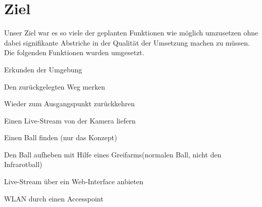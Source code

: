 \chapter{Ziel}
Unser Ziel war es so viele der geplanten Funktionen wie möglich umzusetzen ohne dabei signifikante Abstriche in der Qualität der Umsetzung machen zu müssen. Die folgenden Funktionen wurden umgesetzt.

\begin{capitemize}
	\item Erkunden der Umgebung
	\item Den zurückgelegten Weg merken
	\item Wieder zum Ausgangspunkt zurückkehren
	\item Einen Live-Stream von der Kamera liefern
	\item Einen Ball finden (nur das Konzept)
	\item Den Ball aufheben mit Hilfe eines Greifarms(normalen Ball, nicht den Infrarotball)
	\item Live-Stream über ein Web-Interface anbieten
	\item WLAN durch einen Accesspoint
\end{capitemize}